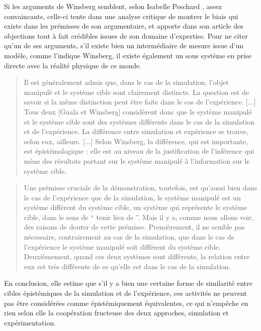 Si les arguments de Winsberg semblent, selon Isabelle Peschard \autocites{Peschard2010b, Peschard2013}, assez convaincants, celle-ci tente dans une analyse critique de montrer le biais qui existe dans les prémisses de son argumentaire, et apporte dans son article des objections tout à fait crédibles issues de son domaine d'expertise. Pour ne citer qu'un de ses arguments, s'il existe bien un intermédiaire de mesure issue d'un modèle, comme l'indique Winsberg, il existe également un sous système en prise directe avec la réalité physique de ce monde.

\blockquote[\cite{Peschard2013}]{Il est généralement admis que, dans le cas de la simulation, l'objet manipulé et le système cible sont clairement distincts. La question est de savoir si la même distinction peut être faite dans le cas de l'expérience. [...] Tous deux [Guala et Winsberg] considèrent donc que le système manipulé et le système cible sont des systèmes différents dans le cas de la simulation et de l'expérience. La différence entre simulation et expérience se trouve, selon eux, ailleurs. [...] Selon Winsberg, la différence, qui est importante, est épistémologique : elle est au niveau de la justification de l'inférence qui mène des résultats portant sur le système manipulé à l'information sur le système cible.}

\blockquote[\cite{Peschard2013}]{Une prémisse cruciale de la démonstration, toutefois, est qu’aussi bien dans le cas de l’expérience que de la simulation, le système manipulé est un système différent du système cible, un système qui représente le système cible, dans le sens de \enquote{ tenir lieu de }. Mais il y a, comme nous allons voir, des raisons de douter de cette prémisse. Premièrement, il ne semble pas nécessaire, contrairement au cas de la simulation, que dans le cas de l’expérience le système manipulé soit différent du système cible. Deuxièmement, quand ces deux systèmes sont différents, la relation entre eux est très différente de ce qu’elle est dans le cas de la simulation.}

En conclusion, elle estime que s'il y a bien une certaine forme de similarité entre cibles épistémiques de la simulation et de l'expérience, ces activités ne peuvent pas être considérées comme épistémiquement équivalentes, ce qui n'empêche en rien selon elle la coopération fructeuse des deux approches, simulation et expérimentation.

